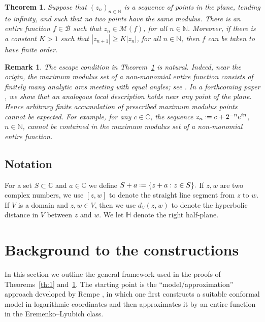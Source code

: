 \documentclass[a4paper, 11pt, reqno]{amsart}
\numberwithin{equation}{section}
\theoremstyle{plain}
\newtheorem{theorem}{Theorem}[section]
\newcommand*{\defeq}{\mathrel{\vcenter{\baselineskip0.5ex \lineskiplimit0pt
 \hbox{\scriptsize.}\hbox{\scriptsize.}}}=}
\newtheorem*{remark}{Remark}%
\theoremstyle{remark}
\newcommand{\C}{{\mathbb{C}}}
\newcommand{\N}{{\mathbb{N}}}
\newcommand{\M}{{\mathcal{M}}}
\newcommand{\B}{{\mathcal{B}}}
\begin{document}
\begin{theorem}
	\label{th:2}
	Suppose that \((z_n)_{n\in\N}\) is a sequence of points in the plane, tending to infinity, and such that no two points have the same modulus. There is an entire function \(f\in\B\) such that \(z_n\in\M(f)\), for all \(n\in\N\). Moreover, if there is a constant \(K>1\) such that \(|z_{n+1}|\geq K|z_n|\), for all \(n\in\N\), then \(f\) can be taken to have finite order.
\end{theorem}

\begin{remark}\normalfont
	The escape condition in Theorem~\ref{th:2} is natural. Indeed, near the origin, the maximum modulus set of a non-monomial entire function consists of finitely many analytic arcs meeting with equal angles; see \cite{Hayman, leti_dave_vasso}. In a forthcoming paper \cite{junctionpoints}, we show that an analogous local description holds near any point of the plane. Hence arbitrary finite accumulation of prescribed maximum modulus points cannot be expected. For example, for any \(c\in\C\), the sequence \(z_n\defeq c+2^{-n}e^{in}\), \(n\in\N\), cannot be contained in the maximum modulus set of a non-monomial entire function.
\end{remark}
%
%
\subsection*{Notation}
For a set $S \subset \C$ and $a \in \C$ we define
$S+a \defeq \{ z + a : z \in S \}.$ If $z,w$ are two complex numbers, we use $[z,w]$ to denote the straight line segment from $z$ to $w$. If $V$ is a domain and $z, w \in V$, then we use $d_V(z, w)$ to denote the hyperbolic distance in $V$ between $z$ and $w$. We let $\mathbb{H}$ denote the right half-plane. 

%
%




\section{Background to the constructions}

In this section we outline the general framework used in the proofs of Theorems~\ref{th:1} and~\ref{th:2}. The starting point is the ``model/approximation'' approach developed by Rempe \cite{lasse_model14}, in which one first constructs a suitable conformal model in logarithmic coordinates and then approximates it by an entire function in the Eremenko--Lyubich class. 
\end{document}
